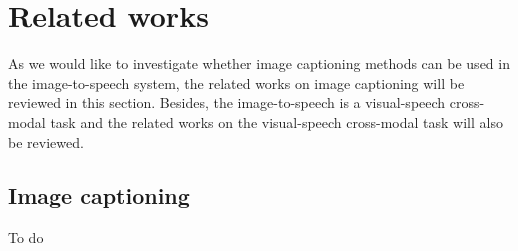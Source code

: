 \documentclass[journal,comsoc]{IEEEtran}
\begin{document}
\section{Related works}
\label{sc:related works}

As we would like to investigate whether image captioning methods can be used in the image-to-speech system, the related works on image captioning will be reviewed in this section. Besides, the image-to-speech is a visual-speech cross-modal task and the related works on the visual-speech cross-modal task will also be reviewed.



\subsection{Image captioning}
To do










\end{document}
